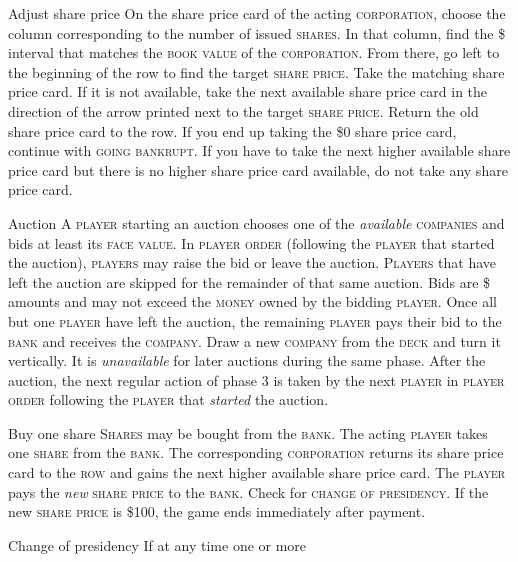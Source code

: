 \documentclass[11pt,a4paper]{article}
\newenvironment{my_description}
  {\begin{list}{}{\setlength{\labelwidth}{0pt}
   \leftmargin=1.2em
   \setlength{\itemindent}{-\leftmargin}
   \renewcommand{\makelabel}{\descriptionlabel}}
  \setlength{\itemsep}{1pt}
  \setlength{\parskip}{0pt}
  \setlength{\parsep}{0pt}
  }
  {\end{list}}
\begin{document}
\begin{multicols}{2}
{\begin{my_description}
\item[Adjust share price] On the share price card of the acting
  \textsc{corporation}, choose the column corresponding to the number
  of issued \textsc{shares}. In that column, find the \$ interval that
  matches the \textsc{book value} of the \textsc{corporation}. From
  there, go left to the beginning of the row to find the target
  \textsc{share price}. Take the matching share price card. If it is
  not available, take the next available share price card in the
  direction of the arrow printed next to the target \textsc{share
    price}. Return the old share price card to the row. If you end up
  taking the \$0 share price card, continue with \textsc{going
    bankrupt}. If you have to take the next higher available share
  price card but there is no higher share price card available, do not
  take any share price card.
\item[Auction] A \textsc{player} starting an auction chooses one of
  the \emph{available} \textsc{companies} and bids at least its
  \textsc{face value}. In \textsc{player order} (following the
  \textsc{player} that started the auction), \textsc{players} may
  raise the bid or leave the auction. \textsc{Players} that have left
  the auction are skipped for the remainder of that same auction. Bids
  are \$ amounts and may not exceed the \textsc{money} owned by the
  bidding \textsc{player}. Once all but one \textsc{player} have left
  the auction, the remaining \textsc{player} pays their bid to the
  \textsc{bank} and receives the \textsc{company}. Draw a new
  \textsc{company} from the \textsc{deck} and turn it vertically. It
  is \emph{unavailable} for later auctions during the same
  phase. After the auction, the next regular action of phase 3 is
  taken by the next \textsc{player} in \textsc{player order} following
  the \textsc{player} that \emph{started} the auction.
\item[Buy one share] \textsc{Shares} may be bought from the
  \textsc{bank}. The acting \textsc{player} takes one \textsc{share}
  from the \textsc{bank}. The corresponding \textsc{corporation}
  returns its share price card to the \textsc{row} and gains the next
  higher available share price card. The \textsc{player} pays the
  \emph{new} \textsc{share price} to the \textsc{bank}. Check for
  \textsc{change of presidency}. If the new \textsc{share price} is
  \$100, the game ends immediately after payment.
\item[Change of presidency] If at any time one or more

\end{my_description}}
\end{multicols}
\end{document}
